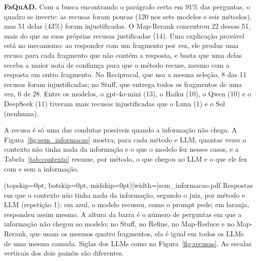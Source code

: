 \textbf{FaQuAD.} Com a busca encontrando o parágrafo certo em 91\% das perguntas, o quadro se inverte: as recusas foram poucas (120 nos sete modelos e seis métodos), mas 51 delas (43\%) foram injustificadas. O Map-Rerank concentrou 22 dessas 51, mais do que as suas próprias recusas justificadas (14). Uma explicação provável está no mecanismo: ao responder com um fragmento por vez, ele produz uma recusa para cada fragmento que não contém a resposta, e basta que uma delas receba a maior nota de confiança para que o método recuse, mesmo com a resposta em outro fragmento. No Reciprocal, que usa a mesma seleção, 8 das 11 recusas foram injustificadas; no Stuff, que entrega todos os fragmentos de uma vez, 6 de 28. Entre os modelos, o gpt-4o-mini (13), o Haiku (10), o Qwen (10) e o DeepSeek (11) tiveram mais recusas injustificadas que o Luna (1) e o Sol (nenhuma).

A recusa é só uma das condutas possíveis quando a informação não chega. A Figura~\ref{fig:sem_informacao} mostra, para cada método e LLM, quantas vezes o contexto não tinha nada da informação e o que o modelo fez nesses casos, e a Tabela~\ref{tab:contexto} resume, por método, o que chegou ao LLM e o que ele fez com e sem a informação.

\Figure[!t](topskip=0pt, botskip=0pt, midskip=0pt)[width=\textwidth]{sem_informacao.pdf}
{Respostas em que o contexto não tinha nada da informação, segundo o juiz, por método e LLM (repetição 1): em azul, o modelo recusou, como o prompt pede; em laranja, respondeu assim mesmo. A altura da barra é o número de perguntas em que a informação não chegou ao modelo; no Stuff, no Refine, no Map-Reduce e no Map-Rerank, que usam os mesmos quatro fragmentos, ela é igual em todos os LLMs de uma mesma camada. Siglas dos LLMs como na Figura~\ref{fig:recusas}. As escalas verticais dos dois painéis são diferentes.\label{fig:sem_informacao}}


